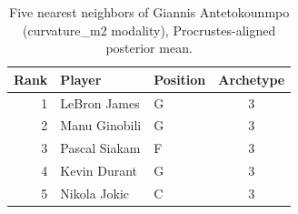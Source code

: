 \begin{table}[htbp]
  \centering\small
  \begin{tabular}{rllc}
    \toprule
    Rank & Player & Position & Archetype \\
    \midrule
    1 & LeBron James & G & 3 \\
    2 & Manu Ginobili & G & 3 \\
    3 & Pascal Siakam & F & 3 \\
    4 & Kevin Durant & G & 3 \\
    5 & Nikola Jokic & C & 3 \\
    \bottomrule
  \end{tabular}
  \caption{Five nearest neighbors of Giannis Antetokounmpo (curvature_m2 modality), Procrustes-aligned posterior mean.}
  \label{tab:Giannis_Antetokounmpo_neighbors_curvature_m2}
\end{table}

